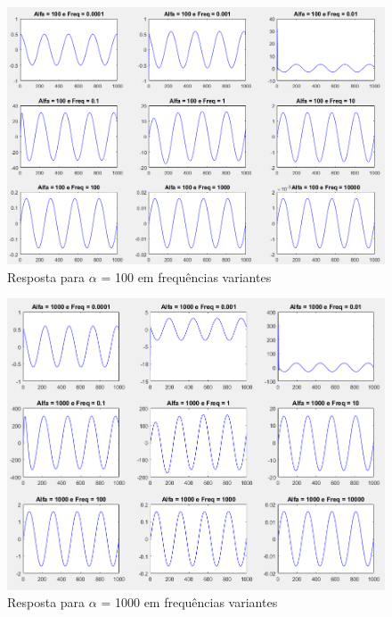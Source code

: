 \documentclass[a4paper, 12pt]{article}
\begin{document}
			\begin{figure}[!ht]
				\centering
				\includegraphics[scale=0.48]{img/3k_alfa6.png}
				\caption{Resposta para $\alpha$ = 100 em frequências variantes}	
			\end{figure}		
			\begin{figure}[!ht]
				\centering
				\includegraphics[scale=0.49]{img/3k_alfa7.png}
				\caption{Resposta para $\alpha$ = 1000 em frequências variantes}	
			\end{figure}				
			\clearpage							
\end{document}
